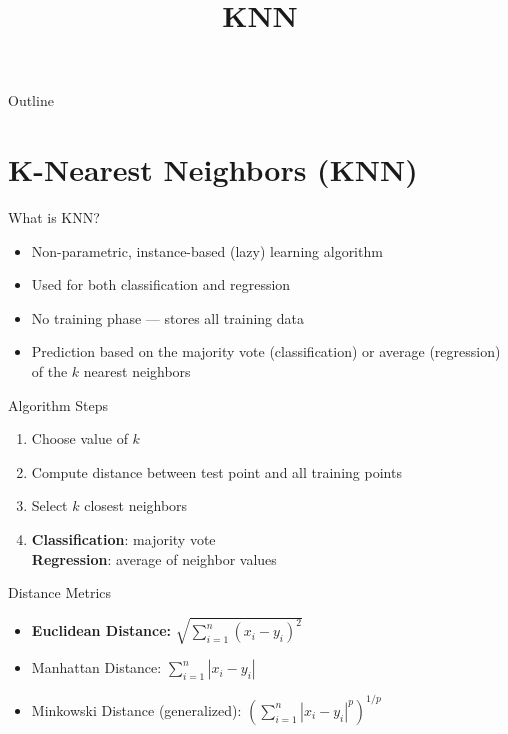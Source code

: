 \documentclass{beamer}
\title{KNN}
\subtitle{}
\date{}
\begin{document}
{
\begin{frame}
    \titlepage
\end{frame}
}

\begin{frame}{Outline}
    \tableofcontents
\end{frame}


\section{K-Nearest Neighbors (KNN)}
\begin{frame}{What is KNN?}
  \begin{itemize}
    \item Non-parametric, instance-based (lazy) learning algorithm
    \item Used for both classification and regression
    \item No training phase — stores all training data
    \item Prediction based on the majority vote (classification) or average (regression) of the $k$ nearest neighbors
  \end{itemize}
\end{frame}

\begin{frame}{Algorithm Steps}
  \begin{enumerate}
    \item Choose value of $k$
    \item Compute distance between test point and all training points
    \item Select $k$ closest neighbors
    \item \textbf{Classification}: majority vote \\
          \textbf{Regression}: average of neighbor values
  \end{enumerate}
\end{frame}

\begin{frame}{Distance Metrics}
  \begin{itemize}
    \item \textbf{Euclidean Distance:} $\sqrt{\sum_{i=1}^n (x_i - y_i)^2}$
    \item Manhattan Distance: $\sum_{i=1}^n |x_i - y_i|$
    \item Minkowski Distance (generalized): $\left( \sum_{i=1}^n |x_i - y_i|^p \right)^{1/p}$
  \end{itemize}
\end{frame}
\end{document}
